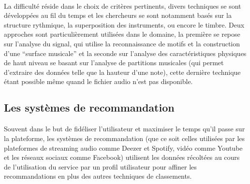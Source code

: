 \documentclass[soumission]{ir}
\begin{document}
\paragraph{}
La difficulté réside dans le choix de critères pertinents, divers techniques se sont développées au fil du 
temps et les chercheurs se sont notamment basés sur la structure rythmique, la superposition des instruments, 
ou encore le timbre. Deux approches sont particulièrement utilisées dans le domaine, la première se repose 
sur l’analyse du signal, qui utilise la reconnaissance de motifs et la construction d’une “surface musicale” 
\cite{TechniqueSimilarites} et la seconde sur l'analyse des caractéristiques physiques de haut niveau se 
basant sur l’analyse de partitions musicales (qui permet d’extraire des données telle que la hauteur d’une 
note), cette dernière technique étant possible même quand le fichier audio n’est pas disponible.

\subsection{Les systèmes de recommandation}
\paragraph{}
Souvent dans le but de fidéliser l’utilisateur et maximiser le temps qu’il passe sur la plateforme, les 
systèmes de recommandation (que ce soit celles utilisées par les plateformes de streaming audio comme Deezer 
et Spotify, vidéo comme Youtube et les réseaux sociaux comme Facebook) utilisent les données récoltées au 
cours de l’utilisation du service par un profil utilisateur pour affiner les recommandations en plus des 
autres techniques de classements.
\end{document}
